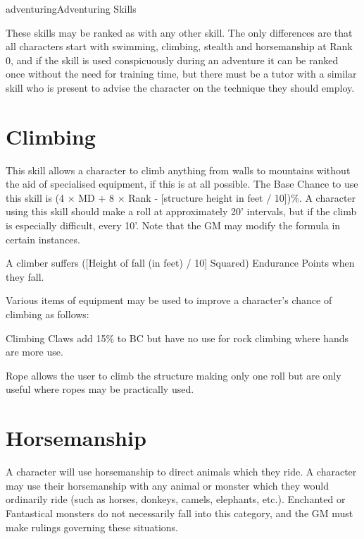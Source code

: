 \begin{Skill}[1.2]{adventuring}{Adventuring Skills}

These skills may be ranked as with any other skill.  The only
differences are that all characters start with swimming, climbing,
stealth and horsemanship at Rank 0, and if the skill is used
conspicuously during an adventure it can be ranked once without the
need for training time, but there must be a tutor with a similar skill
who is present to advise the character on the technique they should
employ.

\section{Climbing}
\label{adventuring:climbing}
This skill allows a character to climb anything from walls to
mountains without the aid of specialised equipment, if this is at all
possible.  The Base Chance to use this skill is (4 × MD + 8 × Rank -
[structure height in feet / 10])\%.  A character using this skill
should make a roll at approximately 20’ intervals, but if the climb is
especially difficult, every 10’.  Note that the GM may modify the
formula in certain instances.

A climber suffers ([Height of fall (in feet) / 10] Squared) Endurance
Points when they fall.

Various items of equipment may be used to improve a character’s chance
of climbing as follows:
\begin{Itemize}
  
\item Climbing Claws add 15\% to BC but have no use for rock climbing
  where hands are more use.

\item Rope allows the user to climb the structure making only one roll
  but are only useful where ropes may be practically used.

\end{Itemize}

\section{Horsemanship}
\label{horsemanship}
A character will use horsemanship to direct animals which they ride.
A character may use their horsemanship with any animal or monster
which they would ordinarily ride (such as horses, donkeys, camels,
elephants, etc.). Enchanted or Fantastical monsters do not necessarily
fall into this category, and the GM must make rulings governing these
situations.


\end{Skill}
